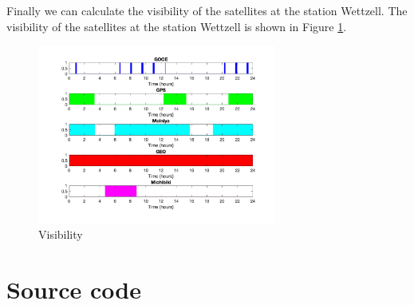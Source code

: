 \documentclass[12pt
,headinclude
,headsepline
,bibtotocnumbered
]{scrartcl}
\begin{document}
Finally we can calculate the visibility of the satellites at the station Wettzell. The visibility of the satellites at the station Wettzell is shown in Figure \ref{fig:visibility}.
\begin{figure}[H]
    \centering
    \includegraphics[width=0.7\textwidth]{plots/visual.png}
    \caption{Visibility}
    \label{fig:visibility}
\end{figure}
\newpage
\section*{Source code}




\end{document}
